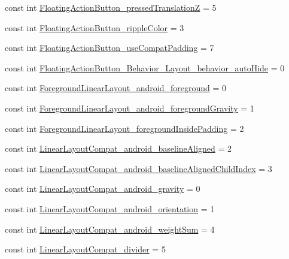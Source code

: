 \begin{CompactItemize}
\item 
const int \hyperlink{class__2doo_1_1_droid_1_1_resource_1_1_styleable_1e1726b0eb3473d6eba304c36f37169f}{FloatingActionButton\_\-pressedTranslationZ} = 5
\item 
const int \hyperlink{class__2doo_1_1_droid_1_1_resource_1_1_styleable_36b7ddb7e871366fc7e89cf4d905f9ef}{FloatingActionButton\_\-rippleColor} = 3
\item 
const int \hyperlink{class__2doo_1_1_droid_1_1_resource_1_1_styleable_0f002a57577e0b70fdc99af419c026a7}{FloatingActionButton\_\-useCompatPadding} = 7
\item 
const int \hyperlink{class__2doo_1_1_droid_1_1_resource_1_1_styleable_11320354aea5c7914e78b8c955f61d70}{FloatingActionButton\_\-Behavior\_\-Layout\_\-behavior\_\-autoHide} = 0
\item 
const int \hyperlink{class__2doo_1_1_droid_1_1_resource_1_1_styleable_9ba01ce16b102c6eefe4b3d6152b20e6}{ForegroundLinearLayout\_\-android\_\-foreground} = 0
\item 
const int \hyperlink{class__2doo_1_1_droid_1_1_resource_1_1_styleable_c632911f96958c282fbace804e332a36}{ForegroundLinearLayout\_\-android\_\-foregroundGravity} = 1
\item 
const int \hyperlink{class__2doo_1_1_droid_1_1_resource_1_1_styleable_672d3913ca3ff3aa390f667e414a56ee}{ForegroundLinearLayout\_\-foregroundInsidePadding} = 2
\item 
const int \hyperlink{class__2doo_1_1_droid_1_1_resource_1_1_styleable_b05e90926a5ef9aa113fa0a472b0b80b}{LinearLayoutCompat\_\-android\_\-baselineAligned} = 2
\item 
const int \hyperlink{class__2doo_1_1_droid_1_1_resource_1_1_styleable_39437a2cd57f8210d237605cd5097f0a}{LinearLayoutCompat\_\-android\_\-baselineAlignedChildIndex} = 3
\item 
const int \hyperlink{class__2doo_1_1_droid_1_1_resource_1_1_styleable_431e9e379e7a766752b4d24caf743550}{LinearLayoutCompat\_\-android\_\-gravity} = 0
\item 
const int \hyperlink{class__2doo_1_1_droid_1_1_resource_1_1_styleable_edbecf72af093155698e887df7eb0745}{LinearLayoutCompat\_\-android\_\-orientation} = 1
\item 
const int \hyperlink{class__2doo_1_1_droid_1_1_resource_1_1_styleable_b07a0c71b3093a821ee187fdcd82f2b1}{LinearLayoutCompat\_\-android\_\-weightSum} = 4
\item 
const int \hyperlink{class__2doo_1_1_droid_1_1_resource_1_1_styleable_4967766f5d70a94f9e53d6df2fad8f81}{LinearLayoutCompat\_\-divider} = 5

\end{CompactItemize}
